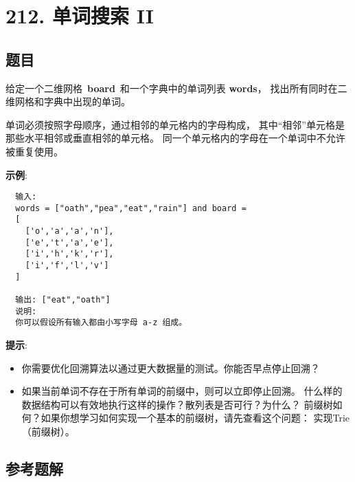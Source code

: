 \newpage
\section{212. 单词搜索 II}
\label{leetcode:212}

\subsection{题目}

给定一个二维网格 \textbf{board} 和一个字典中的单词列表 \textbf{words}，
找出所有同时在二维网格和字典中出现的单词。

单词必须按照字母顺序，通过相邻的单元格内的字母构成，
其中“相邻”单元格是那些水平相邻或垂直相邻的单元格。
同一个单元格内的字母在一个单词中不允许被重复使用。

\textbf{示例}:

\begin{verbatim}
  输入:
  words = ["oath","pea","eat","rain"] and board =
  [
    ['o','a','a','n'],
    ['e','t','a','e'],
    ['i','h','k','r'],
    ['i','f','l','v']
  ]

  输出: ["eat","oath"]
  说明:
  你可以假设所有输入都由小写字母 a-z 组成。
\end{verbatim}

\textbf{提示}:

\begin{itemize}
  \item 你需要优化回溯算法以通过更大数据量的测试。你能否早点停止回溯？
  \item 如果当前单词不存在于所有单词的前缀中，则可以立即停止回溯。
  什么样的数据结构可以有效地执行这样的操作？散列表是否可行？为什么？
  前缀树如何？如果你想学习如何实现一个基本的前缀树，请先查看这个问题： 实现Trie（前缀树）。
\end{itemize}

\subsection{参考题解}

